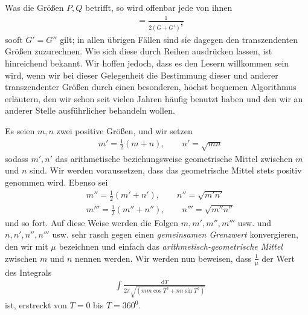 \begingroup
\renewcommand{\arraystretch}{1.45}

Was die Größen $P,Q$ betrifft, so wird offenbar jede von ihnen
\[
\begin{aligned}
&=\frac{1}{2(G+G')^{\frac32}}
\end{aligned}
\]
sooft $G'=G''$ gilt; in allen übrigen Fällen sind sie dagegen den transzendenten Größen zuzurechnen. Wie sich diese durch Reihen ausdrücken lassen, ist hinreichend bekannt. Wir hoffen jedoch, dass es den Lesern willkommen sein wird, wenn wir bei dieser Gelegenheit die Bestimmung dieser und anderer transzendenter Größen durch einen besonderen, höchst bequemen Algorithmus erläutern, den wir schon seit vielen Jahren häufig benutzt haben und den wir an anderer Stelle ausführlicher behandeln wollen.

Es seien $m,n$ zwei positive Größen, und wir setzen
\[
\begin{aligned}
&m'=\frac12(m+n),\qquad n'=\surd{mn}
\end{aligned}
\]
sodass $m',n'$ das arithmetische beziehungsweise geometrische Mittel zwischen $m$ und $n$ sind. Wir werden voraussetzen, dass das geometrische Mittel stets positiv genommen wird. Ebenso sei
\[
\begin{aligned}
&m''=\frac12(m'+n'),\qquad n''=\surd{m'n'}\\[8pt]
&m'''=\frac12(m''+n''),\qquad n'''=\surd{m''n''}
\end{aligned}
\]
und so fort. Auf diese Weise werden die Folgen $m,m',m'',m'''$ usw. und $n,n',n'',n'''$ usw. sehr rasch gegen einen \emph{gemeinsamen Grenzwert} konvergieren, den wir mit $\mu$ bezeichnen und einfach das \emph{arithmetisch-geometrische Mittel} zwischen $m$ und $n$ nennen werden. Wir werden nun beweisen, dass $\frac1\mu$ der Wert des Integrals
\[
\begin{aligned}
&\int\frac{\mathrm dT}{2\pi\surd{(mm\cos T^2+nn\sin T^2)}}
\end{aligned}
\]
ist, erstreckt von $T=0$ bis $T=360^0$.


